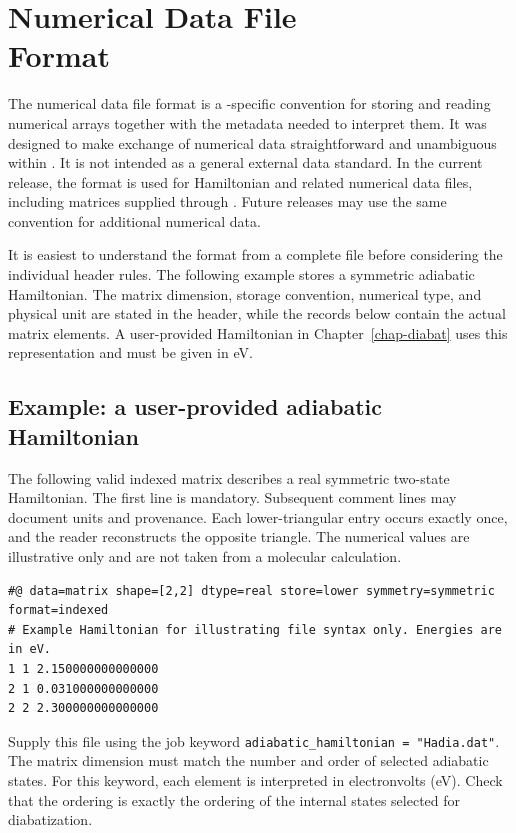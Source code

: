 \chapter[Numerical Data File Format]{Numerical Data File\\Format}\label{app-numfile}
The numerical data file format is a \progname{}-specific convention for storing and reading numerical arrays together with the metadata needed to interpret them. It was designed to make exchange of numerical data straightforward and unambiguous within \progname{}. It is not intended as a general external data standard. In the current release, the format is used for Hamiltonian and related numerical data files, including matrices supplied through . Future releases may use the same convention for additional numerical data.

It is easiest to understand the format from a complete file before considering the individual header rules. The following example stores a symmetric adiabatic Hamiltonian. The matrix dimension, storage convention, numerical type, and physical unit are stated in the header, while the records below contain the actual matrix elements. A user-provided Hamiltonian in Chapter~\ref{chap-diabat} uses this representation and must be given in eV.

\section{Example: a user-provided adiabatic Hamiltonian}\label{sec-numfile-Hexample}
The following valid indexed matrix describes a real symmetric two-state Hamiltonian. The first line is mandatory. Subsequent comment lines may document units and provenance. Each lower-triangular entry occurs exactly once, and the reader reconstructs the opposite triangle. The numerical values are illustrative only and are not taken from a molecular calculation.
\begin{lstlisting}[style=technicalfile]
#@ data=matrix shape=[2,2] dtype=real store=lower symmetry=symmetric format=indexed
# Example Hamiltonian for illustrating file syntax only. Energies are in eV.
1 1 2.150000000000000
2 1 0.031000000000000
2 2 2.300000000000000
\end{lstlisting}
Supply this file using the \progname{} job keyword \texttt{adiabatic\_hamiltonian = "Hadia.dat"}. The matrix dimension must match the number and order of selected adiabatic states. For this keyword, each element is interpreted in electronvolts (eV). Check that the ordering is exactly the ordering of the internal states selected for diabatization.

